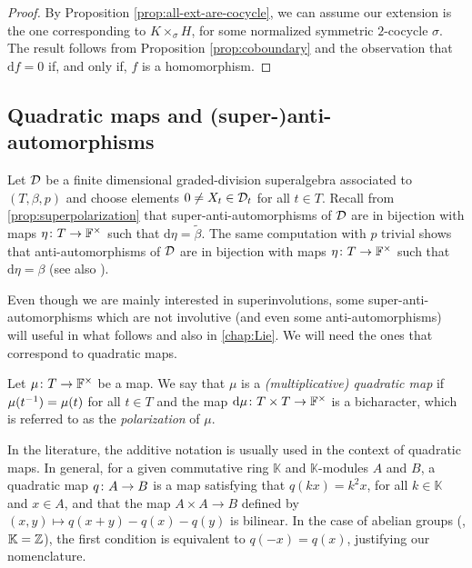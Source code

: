 \begin{proof}
	By Proposition \ref{prop:all-ext-are-cocycle}, we can assume our extension is the one corresponding to $K \times_\sigma H$, for some normalized symmetric $2$-cocycle $\sigma$.
	The result follows from Proposition \ref{prop:coboundary} and the observation that $\mathrm{d}f = 0$ if, and only if, $f$ is a homomorphism.
\end{proof}

\subsection{Quadratic maps and (super-)anti-automorphisms}

Let $\mathcal{D}$ be a finite dimensional graded-division superalgebra associated to $(T, \beta, p)$ and choose elements $0\neq X_t \in \mathcal{D}_t$ for all $t\in T$. 
Recall from \cref{prop:superpolarization} that super-anti-automorphisms of $\mathcal{D}$ are in bijection with maps $\eta\colon T \to \mathbb{F}^\times$ such that $\mathrm{d}\eta = \tilde\beta$. 
The same computation with $p$ trivial shows that anti-automorphisms of $\mathcal{D}$ are in bijection with maps $\eta\colon T \to \mathbb{F}^\times$ such that $\mathrm{d}\eta = \beta$ (see also \cite{livromicha}). 

Even though we are mainly interested in superinvolutions, some su\-per-an\-ti-au\-to\-mor\-phisms which are not involutive (and even some an\-ti-au\-to\-mor\-phisms) will useful in what follows and also in \cref{chap:Lie}. 
We will need the ones that correspond to quadratic maps.

\begin{defi}
	Let $\mu\colon T \to \mathbb{F}^\times$ be a map.
	We say that $\mu$ is a \emph{(multiplicative) quadratic map} if $\mu(t^{-1}) = \mu (t)$ for all $t\in T$ and the map $\mathrm{d}\mu\colon T\times T \to \mathbb{F}^\times$ 
	is a bicharacter, which is referred to as the \emph{polarization} of $\mu$.
\end{defi}

\begin{remark}
	In the literature, the additive notation is usually used in the context of quadratic maps.
	In general, for a given commutative ring $\mathbb K$ and $\mathbb K$-modules $A$ and $B$, a quadratic map $q\colon A \to B$ is a map satisfying that $q(kx) = k^2 x$, for all $k\in \mathbb K$ and $x \in A$, and that the map $A \times A \to B$ defined by $(x,y) \mapsto q(x+y) - q(x) - q(y)$ is bilinear.
	In the case of abelian groups (\ie, $\mathbb K = \mathbb{Z}$), the first condition is equivalent to $q(-x) = q(x)$, justifying our nomenclature. 
\end{remark}

